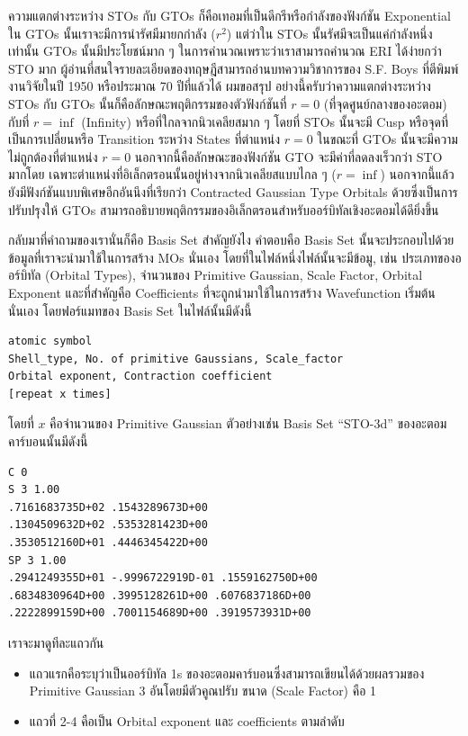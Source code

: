 ความแตกต่างระหว่าง STOs กับ GTOs ก็คือเทอมที่เป็นดีกรีหรือกำลังของฟังก์ชัน Exponential ใน GTOs นั้นเราจะมีการนำรัศมีมายกกำลัง ($r^{2}$) 
แต่ว่าใน STOs นั้นรัศมีจะเป็นแค่กำลังหนึ่งเท่านั้น GTOs นั้นมีประโยชน์มาก ๆ ในการคำนวณเพราะว่าเราสามารถคำนวณ ERI ได้ง่ายกว่า STO มาก 
ผู้อ่านที่สนใจรายละเอียดของทฤษฎีสามารถอ่านบทความวิชาการของ S.F. Boys ที่ตีพิมพ์งานวิจัยในปี 1950 หรือประมาณ 70 ปีที่แล้วได้ ผมขอสรุป%
อย่างนี้ครับว่าความแตกต่างระหว่าง STOs กับ GTOs นั้นก็คือลักษณะพฤติกรรมของตัวฟังก์ชันที่ $r = 0$ (ที่จุดศูนย์กลางของอะตอม) กับที่ $r = \inf$ 
(Infinity) หรือที่ใกลจากนิวเคลียสมาก ๆ โดยที่ STOs นั้นจะมี Cusp หรือจุดที่เป็นการเปลี่ยนหรือ Transition ระหว่าง States ที่ตำแหน่ง 
$r = 0$ ในขณะที่ GTOs นั้นจะมีความไม่ถูกต้องที่ตำแหน่ง $r = 0$ นอกจากนี้คือลักษณะของฟังก์ชัน GTO จะมีค่าที่ลดลงเร็วกว่า STO มากโดย%
เฉพาะตำแหน่งที่อิเล็กตรอนนั้นอยู่ห่างจากนิวเคลียสแบบไกล ๆ ($r = \inf$) นอกจากนี้แล้วยังมีฟังก์ชันแบบพิเศษอีกอันนึงที่เรียกว่า Contracted 
Gaussian Type Orbitals ด้วยซึ่งเป็นการปรับปรุงให้ GTOs สามารถอธิบายพฤติกรรมของอิเล็กตรอนสำหรับออร์บิทัลเชิงอะตอมได้ดียิ่งขึ้น

กลับมาที่คำถามของเรานั่นก็คือ Basis Set สำคัญยังไง คำตอบคือ Basis Set นั้นจะประกอบไปด้วยข้อมูลที่เราจะนำมาใช้ในการสร้าง MOs นั่นเอง 
โดยที่ในไฟล์หนึ่งไฟล์นั้นจะมีข้อมู, เช่น ประเภทของออร์บิทัล (Orbital Types), จำนวนของ Primitive Gaussian, Scale Factor, Orbital 
Exponent และที่สำคัญคือ Coefficients ที่จะถูกนำมาใช้ในการสร้าง Wavefunction เริ่มต้นนั่นเอง โดยฟอร์แมทของ Basis Set ในไฟล์นั้นมีดังนี้

\begin{Verbatim}[frame=single]
atomic symbol
Shell_type, No. of primitive Gaussians, Scale_factor
Orbital exponent, Contraction coefficient
[repeat x times]
\end{Verbatim}

โดยที่ $x$ คือจำนวนของ Primitive Gaussian ตัวอย่างเช่น Basis Set \enquote{STO-3d} ของอะตอมคาร์บอนนั้นมีดังนี้

\begin{Verbatim}[frame=single]
C 0
S 3 1.00
.7161683735D+02 .1543289673D+00
.1304509632D+02 .5353281423D+00
.3530512160D+01 .4446345422D+00
SP 3 1.00
.2941249355D+01 -.9996722919D-01 .1559162750D+00
.6834830964D+00 .3995128261D+00 .6076837186D+00
.2222899159D+00 .7001154689D+00 .3919573931D+00
\end{Verbatim}
    
เราจะมาดูทีละแถวกัน 

\begin{itemize}
    \item แถวแรกคือระบุว่าเป็นออร์บิทัล 1s ของอะตอมคาร์บอนซึ่งสามารถเขียนได้ด้วยผลรวมของ Primitive Gaussian 3 อันโดยมีตัวคูณปรับ%
    ขนาด (Scale Factor) คือ 1
    \item แถวที่ 2-4 คือเป็น Orbital exponent และ  coefficients ตามลำดับ 
\end{itemize}

